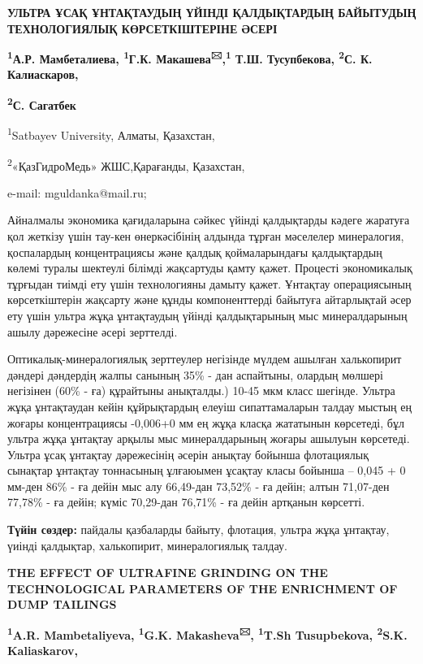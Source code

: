 {\bfseries УЛЬТРА ҰСАҚ ҰНТАҚТАУДЫҢ ҮЙІНДІ ҚАЛДЫҚТАРДЫҢ БАЙЫТУДЫҢ
ТЕХНОЛОГИЯЛЫҚ КӨРСЕТКІШТЕРІНЕ ӘСЕРІ}

{\bfseries \textsuperscript{1}А.Р. Мамбеталиева, \textsuperscript{1}Г.К.
Макашева\textsuperscript{🖂},\textsuperscript{1} Т.Ш. Тусупбекова,
\textsuperscript{2}С. К. Калиаскаров,}

{\bfseries \textsuperscript{2}С. Сагатбек}

\textsuperscript{1}Satbayev University, Алматы, Қазахстан,

\textsuperscript{2}«ҚазГидроМедь» ЖШС,Қарағанды, Қазахстан,

e-mail: mguldanka@mail.ru;

Айналмалы экономика қағидаларына сәйкес үйінді қалдықтарды кәдеге
жаратуға қол жеткізу үшін тау-кен өнеркәсібінің алдында тұрған мәселелер
минералогия, қоспалардың концентрациясы және қалдық қоймаларындағы
қалдықтардың көлемі туралы шектеулі білімді жақсартуды қамту қажет.
Процесті экономикалық тұрғыдан тиімді ету үшін технологияны дамыту
қажет. Ұнтақтау операциясының көрсеткіштерін жақсарту және құнды
компоненттерді байытуға айтарлықтай әсер ету үшін ультра жұқа
ұнтақтаудың үйінді қалдықтарының мыс минералдарының ашылу дәрежесіне
әсері зерттелді.

Оптикалық-минералогиялық зерттеулер негізінде мүлдем ашылған халькопирит
дәндері дәндердің жалпы санының 35\% - дан аспайтыны, олардың мөлшері
негізінен (60\% - ға) құрайтыны анықталды.) 10-45 мкм класс шегінде.
Ультра жұқа ұнтақтаудан кейін құйрықтардың елеуіш сипаттамаларын талдау
мыстың ең жоғары концентрациясы -0,006+0 мм ең жұқа класқа жататынын
көрсетеді, бұл ультра жұқа ұнтақтау арқылы мыс минералдарының жоғары
ашылуын көрсетеді. Ультра ұсақ ұнтақтау дәрежесінің әсерін анықтау
бойынша флотациялық сынақтар ұнтақтау тоннасының ұлғаюымен ұсақтау класы
бойынша -- 0,045 + 0 мм-ден 86\% - ға дейін мыс алу 66,49-дан 73,52\% -
ға дейін; алтын 71,07-ден 77,78\% - ға дейін; күміс 70,29-дан 76,71\% -
ға дейін артқанын көрсетті.

{\bfseries Түйін сөздер:} пайдалы қазбаларды байыту, флотация, ультра жұқа
ұнтақтау, үиінді қалдықтар, халькопирит, минералогиялық талдау.

{\bfseries THE EFFECT OF ULTRAFINE GRINDING ON THE TECHNOLOGICAL PARAMETERS
OF THE ENRICHMENT OF DUMP TAILINGS}

{\bfseries \textsuperscript{1}A.R. Mambetaliyeva, \textsuperscript{1}G.K.
Makasheva\textsuperscript{🖂}, \textsuperscript{1}T.Sh Tusupbekova,
\textsuperscript{2}S.K. Kaliaskarov,}

